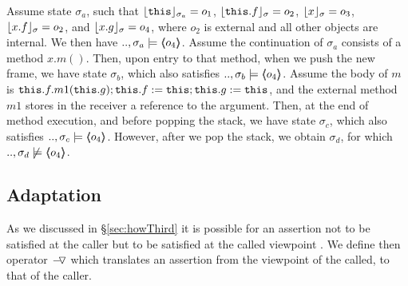 \begin{example}
\label{ex:motivate:scoped}
Assume state $\sigma_a$, such that $\interpret {\sigma_a} {\prg{this}}=o_1$, $\interpret {\sigma} {\prg{this}.f}=o_2$, $\interpret {\sigma} {x}=o_3$, $\interpret {\sigma} {x.f}=o_2$,  
and $\interpret {\sigma} {x.g}=o_4$, where $o_2$ is external and all other objects are internal. 
We then have $..,\sigma_a \models  \inside {o_4}$.
Assume %
 the continuation of $\sigma_a$   consists of a method $x.m()$. Then,
upon entry to that method, when we push the new frame, we have  state $\sigma_b$, which also satisfies $..,\sigma_b \models  \inside {o_4}$.
Assume %
 the   body of $m$ is $\prg{this}.f.m1(\prg{this}.g); \prg{this}.f := \prg{this};  \prg{this}.g := \prg{this}$, and %
 the external method $m1$ stores in the 
receiver a reference to the argument.
Then, at the end of method execution, and before popping the stack, we have   state $\sigma_c$, which also satisfies $..,\sigma_c \models  \inside {o_4}$.
However, after we pop the stack, we obtain $\sigma_d$, for which $..,\sigma_d \not\models  \inside {o_4}$.
\end{example}


   
 \subsection{Adaptation } %
 \label{s:preserve:encaps}
 \label{s:viewAndProtect}
 
 As we discussed in \S  \ref{sec:howThird} it is possible for an assertion  not to be satisfied at the caller
but to be  satisfied at the called viewpoint . %
We define then operator $\FIXSymbolA$ which  translates an assertion from the viewpoint of the called, to that of the caller.


